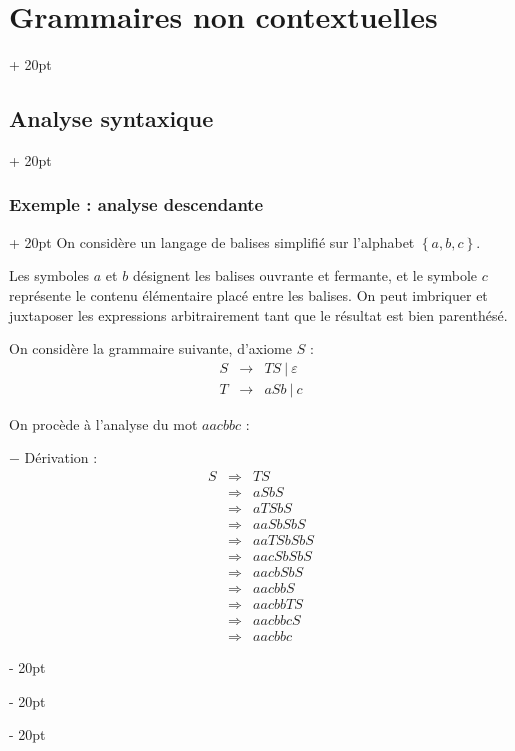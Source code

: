 \documentclass[a4paper, 12pt, twoside]{article}
\newcommand{\set}[1]{\left\{ #1 \right\}}
\newcommand{\ind}[1][20pt]{\advance\leftskip + #1}
\newcommand{\deind}[1][20pt]{\advance\leftskip - #1}
\newenvironment{indt}[2][20pt]{#2 \par \ind[#1]}{\par \deind} %
\begin{document}
\begin{indt}{\section{Grammaires non contextuelles}}
\begin{indt}{\subsection{Analyse syntaxique}}
            \vspace{12pt}
            
            \begin{indt}{\subsubsection{Exemple : analyse descendante}}
                On considère un langage de balises simplifié sur l'alphabet $\set{a, b, c}$.

                Les symboles $a$ et $b$ désignent les balises ouvrante et fermante, et le symbole $c$ représente le contenu élémentaire placé entre les balises.
                On peut imbriquer et juxtaposer les expressions arbitrairement tant que le résultat est bien parenthésé.

                On considère la grammaire suivante, d'axiome $S$ :
                \[
                    \begin{array}{rcl}
                        S
                        &\rightarrow& TS \ |\ \varepsilon
                        \\
                        T
                        &\rightarrow& aSb \ |\ c
                    \end{array}
                \]

                On procède à l'analyse du mot $aacbbc$ :

                $-$ Dérivation :
                \[
                    \begin{array}{rcl}
                        S
                        &\Rightarrow& TS
                        \\
                        &\Rightarrow& aSbS
                        \\
                        &\Rightarrow& aTSbS
                        \\
                        &\Rightarrow& aaSbSbS
                        \\
                        &\Rightarrow& aaTSbSbS
                        \\
                        &\Rightarrow& aacSbSbS
                        \\
                        &\Rightarrow& aacbSbS
                        \\
                        &\Rightarrow& aacbbS
                        \\
                        &\Rightarrow& aacbbTS
                        \\
                        &\Rightarrow& aacbbcS
                        \\
                        &\Rightarrow& aacbbc
                    \end{array}
                \]


\end{indt}
\end{indt}
\end{indt}
\end{document}
